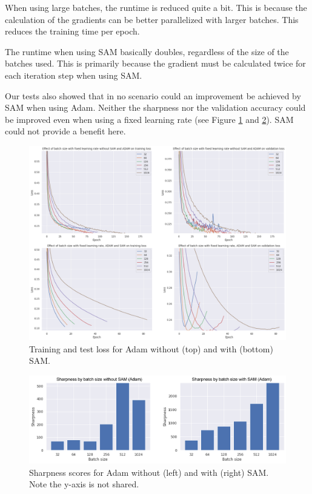 \documentclass[10pt,conference,compsocconf]{IEEEtran}
\begin{document}
When using large batches, the runtime is reduced quite a bit. This is because the calculation of the gradients can be better parallelized with larger batches. This reduces the training time per epoch.

The runtime when using SAM basically doubles, regardless of the size of the batches used. This is primarily because the gradient must be calculated twice for each iteration step when using SAM.

Our tests also showed that in no scenario could an improvement be achieved by SAM when using Adam. Neither the sharpness nor the validation accuracy could be improved even when using a fixed learning rate (see Figure \ref{fig:adam-val-loss-with-without} and \ref{fig:adam-sharpness-with-without}). SAM could not provide a benefit here.

\begin{figure}[tbp]
  \centering
  \includegraphics[width=\columnwidth]{img/figure3_val_loss_with_without_sam_adam}
  \caption{Training and test loss for Adam without (top) and with (bottom) SAM.}
  \vspace{-3mm}
  \label{fig:adam-val-loss-with-without}
\end{figure}
\begin{figure}[tbp]
  \centering
  \includegraphics[width=\columnwidth]{img/figure4_sharpness_with_without_sam_adam}
  \caption{Sharpness scores for Adam without (left) and with (right) SAM. Note the y-axis is not shared.}
  \vspace{-3mm}
  \label{fig:adam-sharpness-with-without}
\end{figure}
\end{document}
